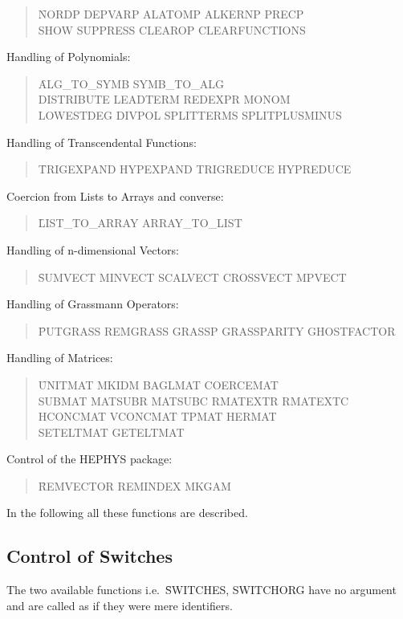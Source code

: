 \begin{itemize}
\begin{quote}
\f{NORDP DEPVARP ALATOMP ALKERNP PRECP \\
 SHOW SUPPRESS CLEAROP CLEARFUNCTIONS}
\end{quote}
\item{Handling of Polynomials:}
\begin{quote}
\f{ALG\_TO\_SYMB SYMB\_TO\_ALG \\
DISTRIBUTE LEADTERM REDEXPR MONOM\\
LOWESTDEG DIVPOL SPLITTERMS SPLITPLUSMINUS}
\end{quote}
\item{Handling of Transcendental Functions:}
\begin{quote}
\f{TRIGEXPAND HYPEXPAND TRIGREDUCE HYPREDUCE}
\end{quote}
\item{Coercion from Lists to Arrays and converse:}
\begin{quote}
\f{LIST\_TO\_ARRAY ARRAY\_TO\_LIST}
\end{quote}
\item{Handling of n-dimensional Vectors:}
\begin{quote}
\f{SUMVECT MINVECT SCALVECT CROSSVECT MPVECT}
\end{quote}
{\item Handling of Grassmann Operators:}
\begin{quote}
\f{PUTGRASS REMGRASS GRASSP GRASSPARITY GHOSTFACTOR}
\end{quote}
\item{Handling of Matrices:}
\begin{quote}
\f{UNITMAT MKIDM BAGLMAT COERCEMAT \\
SUBMAT MATSUBR MATSUBC RMATEXTR RMATEXTC \\
HCONCMAT VCONCMAT TPMAT HERMAT \\
SETELTMAT GETELTMAT}
\end{quote}
\item{Control of the HEPHYS package:}
\begin{quote}
\f{REMVECTOR REMINDEX MKGAM}
\end{quote}
\end{itemize}
In the following all these functions are described.
\subsection{Control of Switches}
The two available functions i.e.\ \f{SWITCHES, SWITCHORG} have
no argument and are called as if they were mere identifiers.

